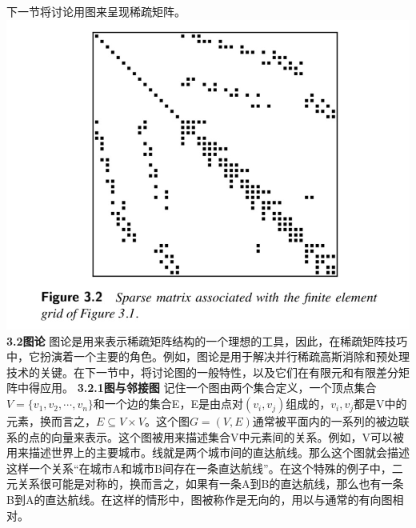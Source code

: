 \documentclass{article}
\begin{document}
下一节将讨论用图来呈现稀疏矩阵。
\newline\newline\newline\newline\newline\newline
\includegraphics[scale=0.4]{3_2.png}
\newline\newline
\textbf{3.2图论}
\newline
图论是用来表示稀疏矩阵结构的一个理想的工具，因此，在稀疏矩阵技巧中，它扮演着一个主要的角色。例如，图论是用于解决并行稀疏高斯消除和预处理技术的关键。在下一节中，将讨论图的一般特性，以及它们在有限元和有限差分矩阵中得应用。
\newline
\textbf{3.2.1图与邻接图}
记住一个图由两个集合定义，一个顶点集合$V =\{v_1,v_2,\cdots,v_n\}$和一个边的集合E，E是由点对$(v_i,v_j)$组成的，$v_i,v_j$都是V中的元素，换而言之，$E\subseteq V\times V$。这个图$G=(V,E)$通常被平面内的一系列的被边联系的点的向量来表示。这个图被用来描述集合V中元素间的关系。例如，V可以被用来描述世界上的主要城市。线就是两个城市间的直达航线。那么这个图就会描述这样一个关系“在城市A和城市B间存在一条直达航线”。在这个特殊的例子中，二元关系很可能是对称的，换而言之，如果有一条A到B的直达航线，那么也有一条B到A的直达航线。在这样的情形中，图被称作是无向的，用以与通常的有向图相对。
  \newline\newline\newline\newline\newline\newline
\end{document}
